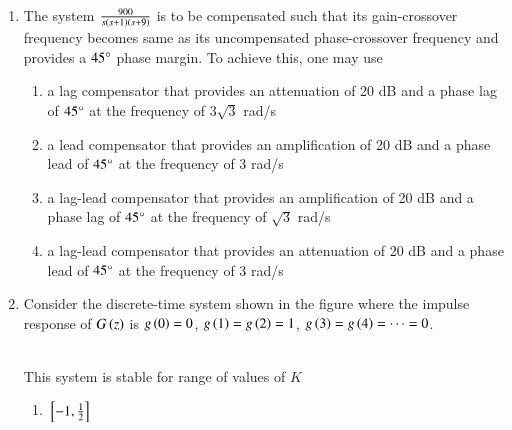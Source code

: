 \documentclass[journal]{IEEEtran}
\begin{document}
\begin{enumerate}
\item The system $\frac{900}{s\left(s+1\right)\left(s+9\right)}$ is to be compensated such that its gain-crossover frequency becomes same as its uncompensated phase-crossover frequency and provides a $45\degree$ phase margin. To achieve this, one may use
    \begin{enumerate}
        \item a lag compensator that provides an attenuation of 20 dB and a phase lag of $45\degree$ at the frequency of $3\sqrt{3}$ rad/s
        \item a lead compensator that provides an amplification of 20 dB and a phase lead of $45\degree$ at the frequency of 3 rad/s
        \item a lag-lead compensator that provides an amplification of 20 dB and a phase lag of $45\degree$ at the frequency of $\sqrt{3}$ rad/s
        \item a lag-lead compensator that provides an attenuation of 20 dB and a phase lead of $45\degree$ at the frequency of 3 rad/s \\
    \end{enumerate}
\item Consider the discrete-time system shown in the figure where the impulse response of $G\left(z\right)$ is $g\left(0\right)=0$, $g\left(1\right)=g\left(2\right)=1$, $g\left(3\right)=g\left(4\right)=\cdots=0$.
\begin{figure}[!ht]
\centering
{}%
\end{figure}\\
     This system is stable for range of values of $K$
\begin{enumerate}
    \item ${}\left[-1, \frac{1}{2}\right]$

\end{enumerate}
\end{enumerate}
\end{document}
